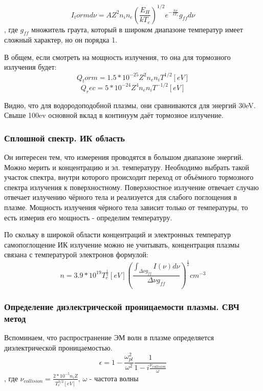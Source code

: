 \documentclass[10pt, a4paper]{article}
\numberwithin{equation}{section}
\begin{document}
\begin{equation}
	I_torm d\nu = A Z^{2} n_i n_e (\frac{E_H}{kT_e})^{1/2} e^{-\frac{h \nu}{kT_e}} g_{ff} d\nu
\end{equation}
, где $g_{ff}$ множитель граута, который в широком диапазоне температур имеет сложный характер, но он порядка 1.

В общем, если смотреть на мощность излучения, то она для тормозного излучения будет:
\begin{equation}
	Q_torm=1.5 *10^{-25} Z^{2} n_e n_i T^{1/2}[eV]
\end{equation}
\begin{equation}
	Q_rec=5 *10^{-24} Z^{4} n_e n_i T^{-1/2}[eV]
\end{equation}

Видно, что для водородоподобной плазмы, они сравниваются для энергий 30eV. Свыше 100ev основной вклад в континуум даёт тормозное излучение.

\subsubsection{Сплошной спектр. ИК область}
\label{11.2.5}

Он интересен тем, что измерения проводятся в большом диапазоне энергий. Можно мерить и концентрацию и эл. температуру.
Необходимо выбрать такой участок спектра, внутри которого происходит переход от объёмного тормозного спектра излучения к поверхностному.
Поверхностное излучение отвечает случаю отвечает излучению чёрного тела и реализуется для слабого поглощения в плазме. Мощность излучения чёрного тела зависит только от температуры, то есть измерив его мощность - определим температуру.

По скольку в широкой области концентраций и электронных температур самопоглощение ИК излучение можно не учитывать, концентрация плазмы связана с температурой электронов формулой:
\begin{equation}
	n=3.9*10^{19} T_e^{\frac{1}{4}}[eV] (\frac{\int_{\Delta \nu g_{ff}} I(\nu) d\nu}{\Delta \nu g_{ff}})^{\frac{1}{2}}   cm^{-3}
\end{equation}

\subsubsection{Определение диэлектрической проницаемости плазмы. СВЧ метод}
\label{11.4}

Вспоминаем, что распространение ЭМ волн в плазме определяется диэлектрической проницаемостью.
\begin{equation}
	\epsilon = 1- \frac{\omega_{pl}^{2}}{\omega^{2}} \frac{1}{1-i \frac{\nu_{collision}}{\omega}}
\end{equation} 
, где $\nu_{collision}=\frac{2*10^{-5} n_i Z}{T_e^{3/2}[eV]}$, $\omega$ - частота волны
\end{document}
